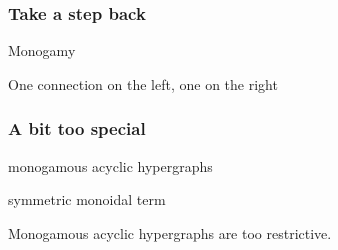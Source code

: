 \begin{frame}
    \frametitle{Take a step back}

    \pause

    \centering
    \LARGE
    \alert{Monogamy}

    \scalebox{0.5}{\hypergraphpeople}

    \pause
    \normalsize

    One connection on the \alert{left}, one on the \alert{right}

    \pause
    \vspace{1em}


\end{frame}
\begin{frame}
    \frametitle{A bit too special}

    \centering

    \begin{minipage}{0.45\textwidth}
        \begin{center}
            \alert{monogamous acyclic} hypergraphs

            \vspace{1em}

        \end{center}
    \end{minipage}
    \quad
    \raisebox{-1em}{\(\leftrightarrow\)}
    \pause
    \begin{minipage}{0.45\textwidth}
        \begin{center}
            symmetric monoidal term

            \vspace{1em}

        \end{center}
    \end{minipage}

    \vspace{1em}
    \normalsize
    \scalebox{0.75}{\hypergraphpeople}

    \Large
    \pause
    Monogamous acyclic hypergraphs are \alert{too restrictive}.

\end{frame}

